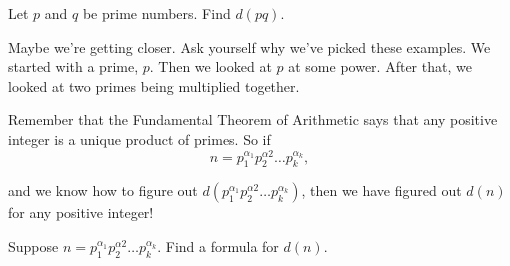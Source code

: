 \vspace{2in}

\begin{exercise}
Let $p$ and $q$ be prime numbers. Find $d(pq)$.
\end{exercise}

\vspace{2in}

\noindent Maybe we're getting closer. Ask yourself why we've picked these examples. We started with a prime, $p$. Then we looked at $p$ at some power. After that, we looked at two primes being multiplied together.

\noindent Remember that the Fundamental Theorem of Arithmetic says that any positive integer is a unique product of primes. So if 
\begin{equation*}
    n = p_1^{\alpha_1}p_2^{\alpha2}\ldots p_k^{\alpha_k},
\end{equation*}

\noindent and we know how to figure out $d(p_1^{\alpha_1}p_2^{\alpha2}\ldots p_k^{\alpha_k})$, then we have figured out $d(n)$ for any positive integer!

\newpage 

\begin{exercise}
Suppose $ n = p_1^{\alpha_1}p_2^{\alpha2}\ldots p_k^{\alpha_k}$. Find a formula for $d(n)$.
\end{exercise}

